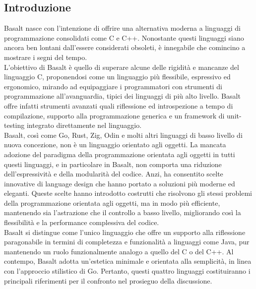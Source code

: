 \subsection{Introduzione}
Basalt nasce con l'intenzione di offrire una alternativa moderna a linguaggi di programmazione consolidati come C e C++. Nonostante 
questi linguaggi siano ancora ben lontani dall'essere considerati obsoleti, è innegabile che comincino a mostrare i segni del tempo. \\

L'obiettivo di Basalt è quello di superare alcune delle rigidità e mancanze del linguaggio C, proponendosi come un linguaggio più flessibile, 
espressivo ed ergonomico, mirando ad equipaggiare i programmatori con strumenti di programmazione all'avanguardia, tipici dei linguaggi di più alto livello. Basalt 
offre infatti strumenti avanzati quali riflessione ed introspezione a tempo di compilazione, supporto alla programmazione generica e un framework di unit-testing 
integrato direttamente nel linguaggio. \\

Basalt, così come Go, Rust, Zig, Odin e molti altri linguaggi di basso livello di nuova concezione, non è un linguaggio orientato agli oggetti. La mancata adozione del
paradigma della programmazione orientata agli oggetti in tutti questi linguaggi, e in particolare in Basalt, non comporta una riduzione dell’espressività e della modularità
del codice. Anzi, ha consentito scelte innovative di language design che hanno portato a soluzioni più moderne ed eleganti. Queste scelte hanno introdotto costrutti che
risolvono gli stessi problemi della programmazione orientata agli oggetti, ma in modo più efficiente, mantenendo sia l’astrazione che il controllo a basso livello,
migliorando così la flessibilità e la performance complessiva del codice. \\

Basalt si distingue come l'unico linguaggio che offre un supporto alla riflessione paragonabile in termini di completezza e funzionalità a linguaggi come Java, 
pur mantenendo un ruolo funzionalmente analogo a quello del C o del C++. Al contempo, Basalt adotta un'estetica minimale e orientata alla semplicità, in linea con 
l'approccio stilistico di Go. Pertanto, questi quattro linguaggi costituiranno i principali riferimenti per il confronto nel prosieguo della discussione. \\

\newpage
 \newpage\
 \newpage
 \newpage
